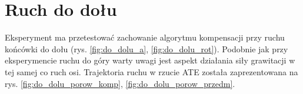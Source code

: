 
\section{Ruch do dołu}

Eksperyment ma przetestować zachowanie algorytmu kompensacji przy ruchu końcówki do dołu (rys. \ref{fig:do_dolu_a}, \ref{fig:do_dolu_rot}). Podobnie jak przy eksperymencie ruchu do góry warty uwagi jest aspekt działania siły grawitacji w tej samej co ruch osi. Trajektoria ruchu w rzucie ATE została zaprezentowana na rys. \ref{fig:do_dolu_porow_komp}, \ref{fig:do_dolu_porow_przedm}.

